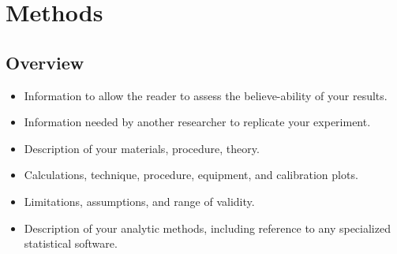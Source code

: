 \chapter{Methods}
\section{Overview}
\begin{itemize}
 \item Information to allow the reader to assess the believe-ability of your results.
 \item Information needed by another researcher to replicate your experiment.
 \item Description of your materials, procedure, theory.
 \item Calculations, technique, procedure, equipment, and calibration plots.
 \item Limitations, assumptions, and range of validity.
 \item Description of your analytic methods, including reference to any specialized statistical software.
\end{itemize}






